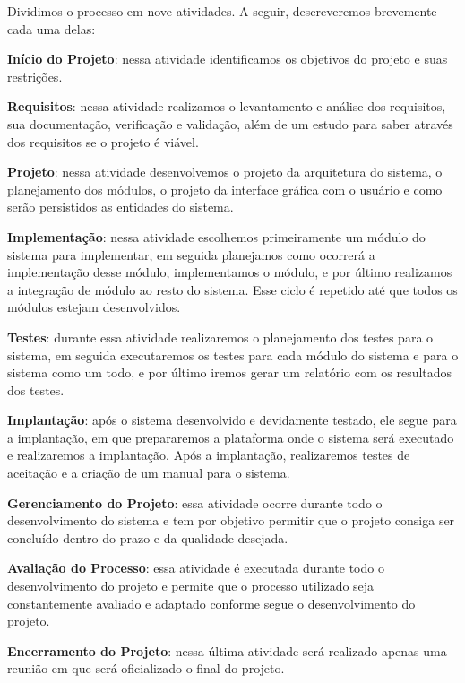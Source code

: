 Dividimos o processo em nove atividades. A seguir, descreveremos brevemente cada uma delas:
\begin{alineascomnumero}
	\item \textbf{In\'icio do Projeto}: nessa atividade identificamos os objetivos do projeto e suas restri\c{c}\~oes.
	\item \textbf{Requisitos}: nessa atividade realizamos o levantamento e an\'alise dos requisitos, sua documenta\c{c}\~ao, verifica\c{c}\~ao e valida\c{c}\~ao, al\'em de um estudo para saber 
atrav\'es dos requisitos se o projeto \'e vi\'avel. 
	\item \textbf{Projeto}: nessa atividade desenvolvemos o projeto da arquitetura do sistema, o planejamento dos m\'odulos, o projeto da interface gr\'afica com o usu\'ario  e como ser\~ao 
persistidos as entidades do sistema.
	\item \textbf{Implementação}: nessa atividade escolhemos primeiramente um m\'odulo do sistema para implementar, em seguida planejamos como ocorrer\'a a implementa\c{c}\~ao desse 
m\'odulo, implementamos o m\'odulo, e por \'ultimo realizamos a integra\c{c}\~ao de m\'odulo ao resto do sistema. Esse ciclo \'e repetido at\'e que todos os m\'odulos estejam desenvolvidos.
	\item \textbf{Testes}: durante essa atividade realizaremos o planejamento dos testes para o sistema, em seguida executaremos os testes 
para cada m\'odulo do sistema e para o sistema como um todo, e por \'ultimo iremos gerar um relat\'orio com os resultados dos testes.
	\item \textbf{Implantação}: ap\'os o sistema desenvolvido e devidamente testado, ele segue para a implanta\c{c}\~ao, em que prepararemos 
a plataforma onde o sistema ser\'a executado e realizaremos a implanta\c{c}\~ao. Ap\'os a implanta\c{c}\~ao, realizaremos testes de 
aceita\c{c}\~ao e a cria\c{c}\~ao de um manual para o sistema.
	\item \textbf{Gerenciamento do Projeto}: essa atividade ocorre durante todo o desenvolvimento do sistema e tem por objetivo permitir que o projeto consiga ser conclu\'ido dentro do prazo e da 
qualidade desejada.
	\item \textbf{Avalia\c{c}\~ao do Processo}: essa atividade \'e executada durante todo o desenvolvimento do projeto e permite que o processo utilizado seja constantemente avaliado e adaptado 
conforme segue o desenvolvimento do projeto.
	\item \textbf{Encerramento do Projeto}: nessa \'ultima atividade ser\'a realizado apenas uma reuni\~ao em que ser\'a oficializado o final do projeto.
\end{alineascomnumero}

